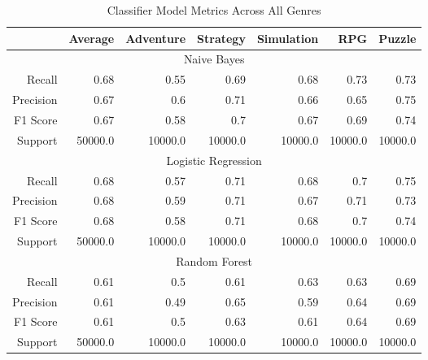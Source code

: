 \begin{table}[h]
    \centering
    \begin{tabular}{r|r|r|r|r|r|r}
        & Average & Adventure & Strategy & Simulation & RPG & Puzzle \\\hline
        \multicolumn{7}{c}{Naive Bayes} \\\hline
        Recall      & 0.68 & 0.55 & 0.69 & 0.68 & 0.73 & 0.73 \\
        Precision   & 0.67 & 0.6 & 0.71 & 0.66 & 0.65 & 0.75 \\
        F1 Score    & 0.67 & 0.58 & 0.7 & 0.67 & 0.69 & 0.74 \\
        Support     & 50000.0 & 10000.0 & 10000.0 & 10000.0 & 10000.0 & 10000.0 \\\hline
        \multicolumn{7}{c}{Logistic Regression} \\\hline
        Recall      & 0.68 & 0.57 & 0.71 & 0.68 & 0.7 & 0.75 \\
        Precision   & 0.68 & 0.59 & 0.71 & 0.67 & 0.71 & 0.73 \\
        F1 Score    & 0.68 & 0.58 & 0.71 & 0.68 & 0.7 & 0.74 \\
        Support     & 50000.0 & 10000.0 & 10000.0 & 10000.0 & 10000.0 & 10000.0 \\\hline
        \multicolumn{7}{c}{Random Forest} \\\hline
        Recall      & 0.61 & 0.5 & 0.61 & 0.63 & 0.63 & 0.69 \\
        Precision   & 0.61 & 0.49 & 0.65 & 0.59 & 0.64 & 0.69 \\
        F1 Score    & 0.61 & 0.5 & 0.63 & 0.61 & 0.64 & 0.69 \\
        Support     & 50000.0 & 10000.0 & 10000.0 & 10000.0 & 10000.0 & 10000.0 \\\hline
    \end{tabular}
    \caption{Classifier Model Metrics Across All Genres}
    \label{tab:combined_model_metrics}
\end{table}